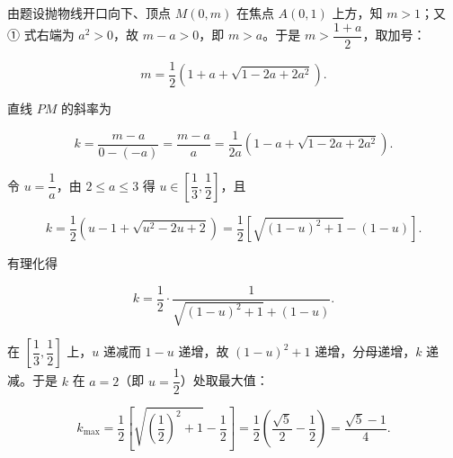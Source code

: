 \begin{answer}
由题设抛物线开口向下、顶点 $M(0,m)$ 在焦点 $A(0,1)$ 上方，知 $m>1$；又 ① 式右端为 $a^{2}>0$，故 $m-a>0$，即 $m>a$。于是 $m>\dfrac{1+a}{2}$，取加号：

\nopagebreak[4]
\[
m=\frac{1}{2}\left(1+a+\sqrt{1-2a+2a^{2}}\right).
\]

直线 $PM$ 的斜率为

\nopagebreak[4]
\[
k=\frac{m-a}{0-(-a)}=\frac{m-a}{a}
=\frac{1}{2a}\left(1-a+\sqrt{1-2a+2a^{2}}\right).
\]

令 $u=\dfrac{1}{a}$，由 $2\le a\le 3$ 得 $u\in\left[\dfrac{1}{3},\dfrac{1}{2}\right]$，且

\nopagebreak[4]
\[
k=\frac{1}{2}\left(u-1+\sqrt{u^{2}-2u+2}\right)
=\frac{1}{2}\left[\sqrt{(1-u)^{2}+1}-(1-u)\right].
\]

有理化得

\nopagebreak[4]
\[
k=\frac{1}{2}\cdot\frac{1}{\sqrt{(1-u)^{2}+1}+(1-u)}.
\]

在 $\left[\dfrac{1}{3},\dfrac{1}{2}\right]$ 上，$u$ 递减而 $1-u$ 递增，故 $(1-u)^{2}+1$ 递增，分母递增，$k$ 递减。于是 $k$ 在 $a=2$（即 $u=\dfrac{1}{2}$）处取最大值：

\nopagebreak[4]
\[
k_{\max}=\frac{1}{2}\left[\sqrt{\left(\frac{1}{2}\right)^{2}+1}-\frac{1}{2}\right]
=\frac{1}{2}\left(\frac{\sqrt{5}}{2}-\frac{1}{2}\right)
=\frac{\sqrt{5}-1}{4}.
\]


\end{answer}